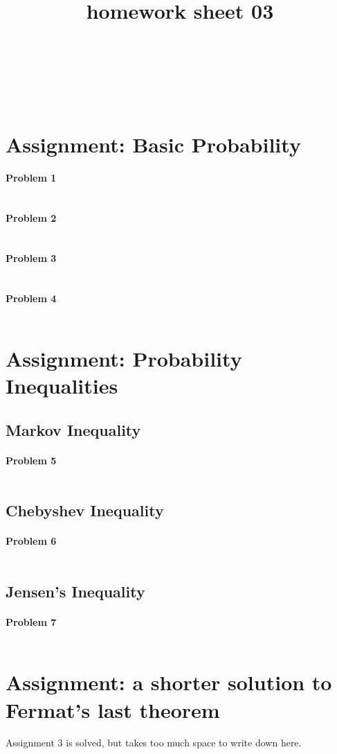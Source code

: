 \documentclass{article}
\title{homework sheet 03}
\author{
\name{Andre Seitz}\\
\imat{03622870}\\
\email{andre.seitz@mytum.de}
\And
\name{Linda Leidig} \\
\imat{03608416}\\
\email{linda.leidig@tum.de}
}
\begin{document}
\maketitle

\section{Assignment: Basic Probability}
\paragraph*{Problem 1}
$\;$ 

\paragraph*{Problem 2}
$\;$ 

\paragraph*{Problem 3}
$\;$ 

\paragraph*{Problem 4}
$\;$ 


\section{Assignment: Probability Inequalities}
\subsection{Markov Inequality}

\paragraph*{Problem 5}
$\;$ 

\subsection{Chebyshev Inequality}

\paragraph*{Problem 6}
$\;$ 

\subsection{Jensen's Inequality}

\paragraph*{Problem 7}
$\;$ 




\section{Assignment: a shorter solution to Fermat's last theorem }
Assignment 3 is solved, but takes too much space to write down here.
\end{document}
